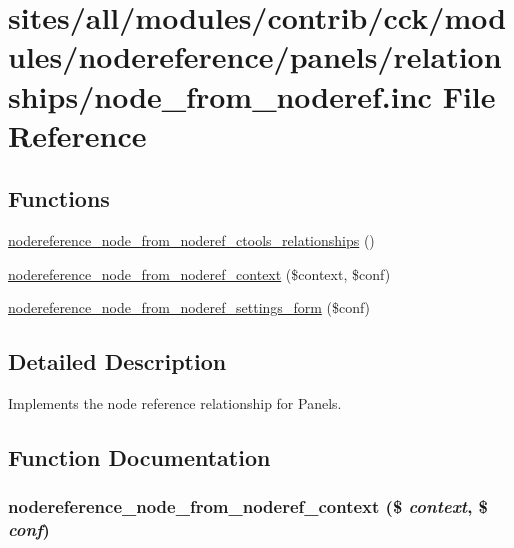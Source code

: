 \hypertarget{node__from__noderef_8inc}{
\section{sites/all/modules/contrib/cck/modules/nodereference/panels/relationships/node\_\-from\_\-noderef.inc File Reference}
\label{node__from__noderef_8inc}
}
\subsection*{Functions}
\begin{CompactItemize}
\item 
\hyperlink{node__from__noderef_8inc_446e9c7eb0ed01220a567aad1aceb2db}{nodereference\_\-node\_\-from\_\-noderef\_\-ctools\_\-relationships} ()
\item 
\hyperlink{node__from__noderef_8inc_0d0194267b17f9bad5ee0799776a4117}{nodereference\_\-node\_\-from\_\-noderef\_\-context} (\$context, \$conf)
\item 
\hyperlink{node__from__noderef_8inc_36bd1b0b8b5a3dcaddb93f7011f1681a}{nodereference\_\-node\_\-from\_\-noderef\_\-settings\_\-form} (\$conf)
\end{CompactItemize}


\subsection{Detailed Description}
Implements the node reference relationship for Panels. 

\subsection{Function Documentation}
\hypertarget{node__from__noderef_8inc_0d0194267b17f9bad5ee0799776a4117}{
\subsubsection[{nodereference\_\-node\_\-from\_\-noderef\_\-context}]{\setlength{\rightskip}{0pt plus 5cm}nodereference\_\-node\_\-from\_\-noderef\_\-context (\$ {\em context}, \/  \$ {\em conf})}}
\label{node__from__noderef_8inc_0d0194267b17f9bad5ee0799776a4117}


